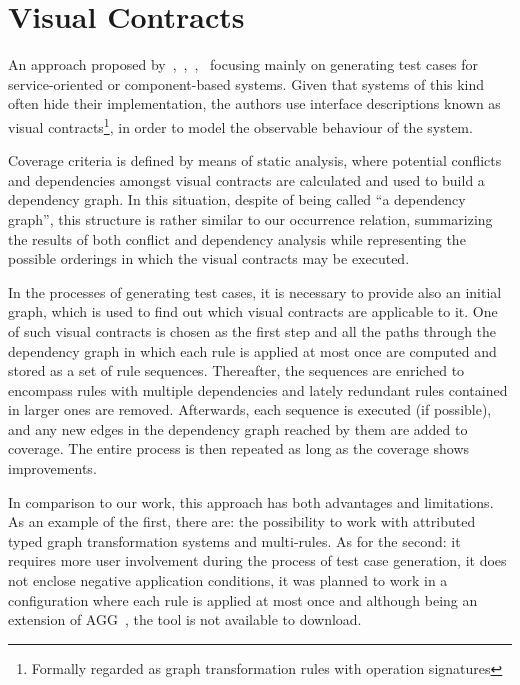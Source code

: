 
\section{Visual Contracts}

An approach proposed by~\cite{Heckel2011},~\cite{Khan2012},~\cite{Khan2012a},~\cite{Runge2013} focusing mainly on generating test cases for service-oriented or component-based systems. Given that systems of this kind often hide their implementation, the authors use interface descriptions known as visual contracts\footnote{ Formally regarded as graph transformation rules with operation signatures}, in order to model the observable behaviour of the system.

Coverage criteria is defined by means of static analysis, where potential conflicts and dependencies amongst visual contracts are calculated and used to build a dependency graph. In this situation, despite of being called ``a dependency graph'', this structure is rather similar to our occurrence relation, summarizing the results of both conflict and dependency analysis while representing the possible orderings in which the visual contracts may be executed.

In the processes of generating test cases, it is necessary to provide also an initial graph, which is used to find out which visual contracts are applicable to it. One of such visual contracts is chosen as the first step and all the paths through the dependency graph in which each rule is applied at most once are computed and stored as a set of rule sequences. Thereafter, the sequences are enriched to encompass rules with multiple dependencies and lately redundant rules contained in larger ones are
removed. Afterwards, each sequence is executed (if possible), and any new edges in the dependency graph reached by them are added to coverage. The entire process is then repeated as long as the coverage shows improvements. 

In comparison to our work, this approach has both advantages and limitations. As an example of the first, there are: the possibility to work with attributed typed graph transformation systems and multi-rules. As for the second: it requires more user involvement during the process of test case generation, it does not enclose negative application conditions, it was planned to work in a configuration where each rule is applied at most once and although being an extension of
AGG~\cite{Taentzer2000}, the tool is not available to download.

